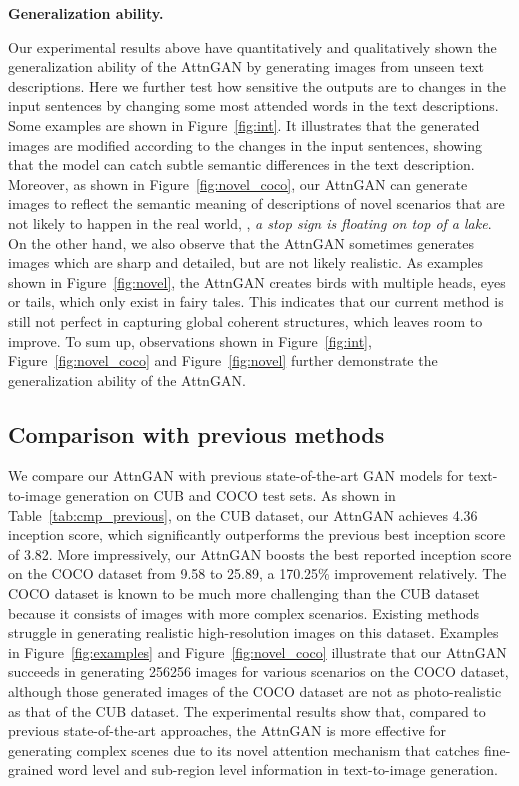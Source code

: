 \documentclass[10pt,twocolumn,letterpaper]{article}
\begin{document}
\textbf{Generalization ability. }{
Our experimental results above have quantitatively and qualitatively shown the generalization ability of the AttnGAN by generating images from unseen text descriptions. Here we further test how sensitive the outputs are to changes in the input sentences by changing some most attended words in the text descriptions. Some examples are shown in Figure~\ref{fig:int}. It illustrates that the generated images are modified according to the changes in the input sentences, showing that the model can catch subtle semantic differences in the text description. Moreover, as shown in Figure~\ref{fig:novel_coco}, our AttnGAN can generate images to reflect the semantic meaning of descriptions of novel scenarios that are not likely to happen in the real world, \eg, \textit{a stop sign is floating on top of a lake}. 
On the other hand, we also observe that the AttnGAN sometimes generates images which are sharp and detailed, but are not likely realistic. As examples shown in Figure~\ref{fig:novel}, the AttnGAN creates birds with multiple heads, eyes or tails, which only exist in fairy tales. This indicates that our current method is still not perfect in capturing global coherent structures, which leaves room to improve. To sum up, observations shown in Figure~\ref{fig:int}, Figure~\ref{fig:novel_coco} and Figure~\ref{fig:novel} further demonstrate the generalization ability of the AttnGAN. 

}






\subsection{Comparison with previous methods} \label{sec:compare}
\vspace{-5pt}
We compare our AttnGAN with previous state-of-the-art GAN models for text-to-image generation on CUB and COCO test sets. As shown in Table~\ref{tab:cmp_previous}, on the CUB dataset, our AttnGAN achieves 4.36 inception score, which significantly outperforms the previous best inception score of 3.82. More impressively, our AttnGAN boosts the best reported inception score on the COCO dataset from 9.58 to 25.89, a 170.25\% improvement relatively. The COCO dataset is known to be much more challenging than the CUB dataset because it consists of images with more complex scenarios. Existing methods struggle in generating realistic high-resolution images on this dataset. Examples in Figure~\ref{fig:examples} and Figure~\ref{fig:novel_coco} illustrate that our AttnGAN succeeds in generating 256256 images for various scenarios on the COCO dataset, although those generated images of the COCO dataset are not as photo-realistic as that of the CUB dataset. The experimental results show that, compared to previous state-of-the-art approaches, the AttnGAN is more effective for generating complex scenes due to its novel attention mechanism that catches fine-grained word level and sub-region level information in text-to-image generation.  
\end{document}
